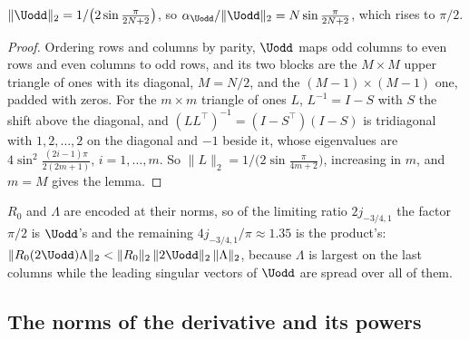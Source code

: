 \begin{lemma}
\label{lem:uodd-norm}
$\|\Uodd\|_2=1/\bigl(2\sin\frac{\pi}{2N+2}\bigr)$, so $\alpha_{\Uodd}/\|\Uodd\|_2=N\sin\frac{\pi}{2N+2}$, which rises to $\pi/2$.
\end{lemma}
\begin{proof}
Ordering rows and columns by parity, $\Uodd$ maps odd columns to even rows and even columns to odd rows, and its two blocks are the $M\times M$ upper triangle of ones with its diagonal, $M=N/2$, and the $(M-1)\times(M-1)$ one, padded with zeros. For the $m\times m$ triangle of ones $L$, $L^{-1}=I-S$ with $S$ the shift above the diagonal, and $(LL^{\top})^{-1}=(I-S^{\top})(I-S)$ is tridiagonal with $1,2,\dots,2$ on the diagonal and $-1$ beside it, whose eigenvalues are $4\sin^2\frac{(2i-1)\pi}{2(2m+1)}$, $i=1,\dots,m$. So $\|L\|_2=1/\bigl(2\sin\frac{\pi}{4m+2}\bigr)$, increasing in $m$, and $m=M$ gives the lemma.
\end{proof}

$R_0$ and $\Lambda$ are encoded at their norms, so of the limiting ratio $2j_{-3/4,1}$ the factor $\pi/2$ is $\Uodd$'s and the remaining $4j_{-3/4,1}/\pi\approx1.35$ is the product's: $\|R_0(2\Uodd)\Lambda\|_2<\|R_0\|_2\,\|2\Uodd\|_2\,\|\Lambda\|_2$, because $\Lambda$ is largest on the last columns while the leading singular vectors of $\Uodd$ are spread over all of them.

\subsection{The norms of the derivative and its powers}
\label{app:G-limits}

